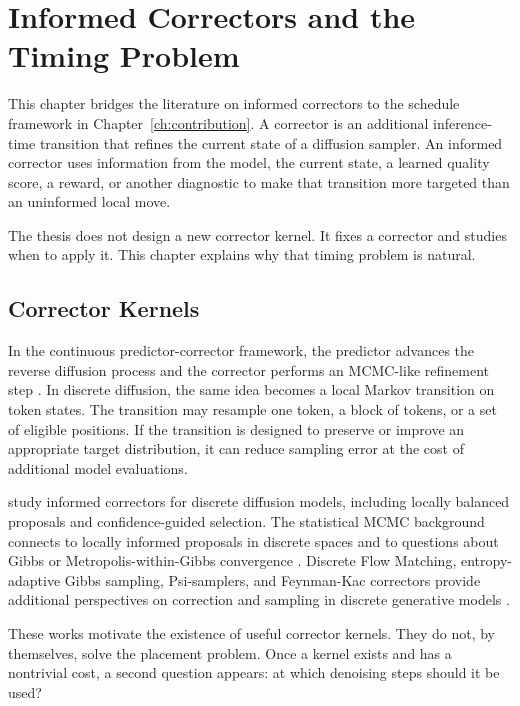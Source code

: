 \chapter{Informed Correctors and the Timing Problem}
\label{ch:informed-correctors}

This chapter bridges the literature on informed correctors to the schedule
framework in Chapter~\ref{ch:contribution}. A corrector is an additional
inference-time transition that refines the current state of a diffusion
sampler. An informed corrector uses information from the model, the current
state, a learned quality score, a reward, or another diagnostic to make that
transition more targeted than an uninformed local move.

The thesis does not design a new corrector kernel. It fixes a corrector and
studies when to apply it. This chapter explains why that timing problem is
natural.

\section{Corrector Kernels}
\label{sec:ch5-corrector-kernels}

In the continuous predictor-corrector framework, the predictor advances the
reverse diffusion process and the corrector performs an MCMC-like refinement
step \parencite{song2021score}. In discrete diffusion, the same idea becomes a
local Markov transition on token states. The transition may resample one token,
a block of tokens, or a set of eligible positions. If the transition is
designed to preserve or improve an appropriate target distribution, it can
reduce sampling error at the cost of additional model evaluations.

\textcite{zhao2024informedcorrectors} study informed correctors for discrete
diffusion models, including locally balanced proposals and confidence-guided
selection. The statistical MCMC background connects to locally informed
proposals in discrete spaces \parencite{zanella2020informedproposals} and to
questions about Gibbs or Metropolis-within-Gibbs convergence
\parencite{roberts1997updating,ascolani2024entropycontraction,secchi2025mwggap}.
Discrete Flow Matching, entropy-adaptive Gibbs sampling, Psi-samplers, and
Feynman-Kac correctors provide additional perspectives on correction and
sampling in discrete generative models
\parencite{gat2024dfm,koh2024eags,deschenaux2026psisamplers,hasan2026fkc}.

These works motivate the existence of useful corrector kernels. They do not,
by themselves, solve the placement problem. Once a kernel exists and has a
nontrivial cost, a second question appears: at which denoising steps should it
be used?

